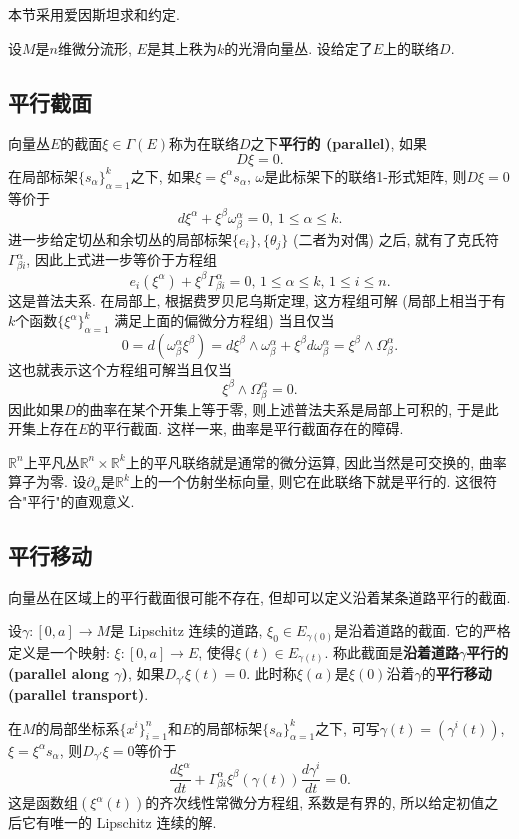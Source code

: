 
本节采用爱因斯坦求和约定.

设$M$是$n$维微分流形, $E$是其上秩为$k$的光滑向量丛. 设给定了$E$上的联络$D$.

\subsection{平行截面}

向量丛$E$的截面$\xi\in\Gamma(E)$称为在联络$D$之下\textbf{平行的 (parallel)}, 如果
$$D\xi=0.$$
在局部标架$\{s_\alpha\}_{\alpha=1}^k$之下, 如果$\xi=\xi^\alpha s_\alpha$, $\omega$是此标架下的联络1-形式矩阵, 则$D\xi=0$等价于
$$
d\xi^\alpha+\xi^\beta\omega^\alpha_\beta=0,\,1\leq \alpha\leq k.
$$
进一步给定切丛和余切丛的局部标架$\{e_i\},\{\theta_j\}$ (二者为对偶) 之后, 就有了克氏符$\Gamma_{\beta i}^\alpha$, 因此上式进一步等价于方程组
$$
e_i(\xi^\alpha)+\xi^\beta\Gamma^\alpha_{\beta i}=0,\,1\leq \alpha\leq k,\,1\leq i\leq n.
$$
这是普法夫系. 在局部上, 根据费罗贝尼乌斯定理, 这方程组可解 (局部上相当于有$k$个函数$\{\xi^\alpha\}_{\alpha=1}^k$ 满足上面的偏微分方程组) 当且仅当
$$
0=d(\omega^\alpha_\beta\xi^\beta)=d\xi^\beta\wedge\omega^\alpha_\beta+\xi^\beta d\omega^\alpha_\beta=\xi^\beta\wedge\Omega_\beta^\alpha.
$$
这也就表示这个方程组可解当且仅当
$$
\xi^\beta\wedge\Omega_\beta^\alpha=0.
$$
因此如果$D$的曲率在某个开集上等于零, 则上述普法夫系是局部上可积的, 于是此开集上存在$E$的平行截面. 这样一来, 曲率是平行截面存在的障碍.

$\mathbb{R}^n$上平凡丛$\mathbb{R}^n\times\mathbb{R}^k$上的平凡联络就是通常的微分运算, 因此当然是可交换的, 曲率算子为零. 设$\partial_\alpha$是$\mathbb{R}^k$上的一个仿射坐标向量, 则它在此联络下就是平行的. 这很符合"平行"的直观意义. 

\subsection{平行移动}
向量丛在区域上的平行截面很可能不存在, 但却可以定义沿着某条道路平行的截面. 

设$\gamma:[0,a]\to M$是 Lipschitz 连续的道路, $\xi_0\in E_{\gamma(0)}$是沿着道路的截面. 它的严格定义是一个映射: $\xi:[0,a]\to E$, 使得$\xi(t)\in E_{\gamma(t)}$. 称此截面是\textbf{沿着道路$\gamma$平行的 (parallel along $\gamma$)}, 如果$D_{\gamma'}\xi(t)=0$. 此时称$\xi(a)$是$\xi(0)$沿着$\gamma$的\textbf{平行移动 (parallel transport)}. 

在$M$的局部坐标系$\{x^i\}_{i=1}^n$和$E$的局部标架$\{s_{\alpha}\}_{\alpha=1}^k$之下, 可写$\gamma(t)=(\gamma^i(t))$, $\xi=\xi^\alpha s_\alpha$, 则$D_{\gamma'}\xi=0$等价于
$$
\frac{d\xi^\alpha}{dt}+\Gamma_{\beta i}^\alpha\xi^\beta(\gamma(t))\frac{d\gamma^i}{dt}=0.
$$
这是函数组$(\xi^\alpha(t))$的齐次线性常微分方程组, 系数是有界的, 所以给定初值之后它有唯一的 Lipschitz 连续的解. 

